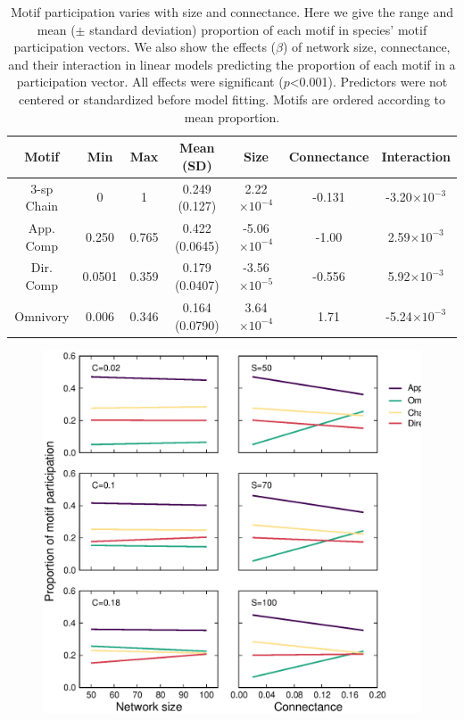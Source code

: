 \documentclass[12pt]{article}
\begin{document}
\begin{spacing}{2.0}
    \begin{table}[hb!]
        \centering
        \caption{Motif participation varies with size and connectance. Here we give the range and mean ($\pm$ standard deviation) proportion of each motif in species' motif participation vectors. 
        We also show the effects ($\beta$) of network size, connectance, and their interaction in linear models predicting the proportion of each motif in a participation vector.
        All effects were significant ($p$\textless0.001).
        Predictors were not centered or standardized before model fitting. Motifs are ordered according to mean proportion.}
        \label{tab:partic_vs_SC}   
        \footnotesize
        \begin{tabular}{c|c c c | c c c}
            Motif & Min & Max & Mean (SD) & Size & Connectance & Interaction \\
            \hline
            3-sp Chain & 0 & 1 & 0.249 (0.127) & 2.22$\times10^{-4}$ & -0.131 & -3.20$\times10^{-3}$ \\
            App. Comp & 0.250 & 0.765 & 0.422 (0.0645) & -5.06$\times10^{-4}$ & -1.00 & 2.59$\times10^{-3}$ \\
            Dir. Comp & 0.0501 & 0.359 & 0.179 (0.0407) & -3.56$\times10^{-5}$ & -0.556 & 5.92$\times10^{-3}$ \\
            Omnivory & 0.006 & 0.346 & 0.164 (0.0790) & 3.64$\times10^{-4}$ & 1.71 & -5.24$\times10^{-3}$ \\   
            \hline
            \end{tabular}
            \end{table}


    \begin{figure}[h!]
        \centering
        \includegraphics[width=.95\textwidth]{figures/roles_vs_SC.eps}
    

\end{figure}
\end{spacing}
\end{document}
